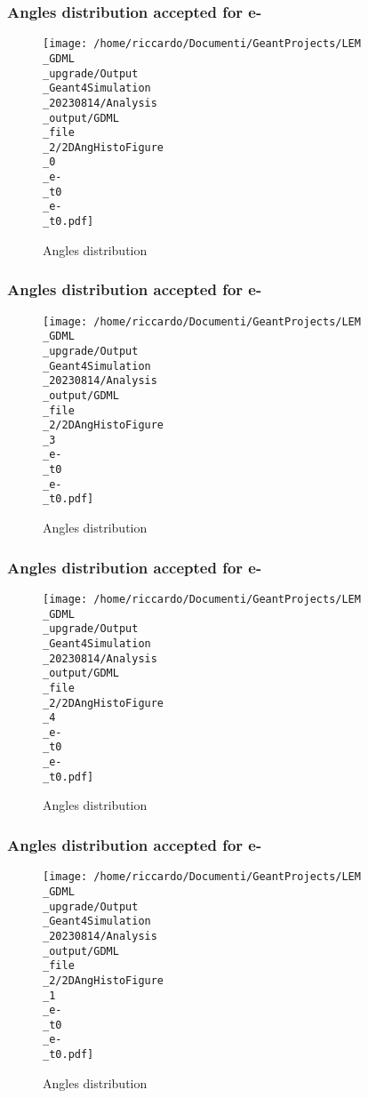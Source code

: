 \documentclass[8pt]{beamer}
\begin{document}
            \begin{frame}
                \frametitle{Angles distribution accepted for e-}
            
        \begin{figure}[h]
            \centering
            \texttt{[image: /home/riccardo/Documenti/GeantProjects/LEM\\\_GDML\\\_upgrade/Output\\\_Geant4Simulation\\\_20230814/Analysis\\\_output/GDML\\\_file\\\_2/2DAngHistoFigure\\\_0\\\_e-\\\_t0\\\_e-\\\_t0.pdf]}
            \caption{Angles distribution}
        \end{figure}
        
            \end{frame}
            
            \begin{frame}
                \frametitle{Angles distribution accepted for e-}
            
        \begin{figure}[h]
            \centering
            \texttt{[image: /home/riccardo/Documenti/GeantProjects/LEM\\\_GDML\\\_upgrade/Output\\\_Geant4Simulation\\\_20230814/Analysis\\\_output/GDML\\\_file\\\_2/2DAngHistoFigure\\\_3\\\_e-\\\_t0\\\_e-\\\_t0.pdf]}
            \caption{Angles distribution}
        \end{figure}
        
            \end{frame}
            
            \begin{frame}
                \frametitle{Angles distribution accepted for e-}
            
        \begin{figure}[h]
            \centering
            \texttt{[image: /home/riccardo/Documenti/GeantProjects/LEM\\\_GDML\\\_upgrade/Output\\\_Geant4Simulation\\\_20230814/Analysis\\\_output/GDML\\\_file\\\_2/2DAngHistoFigure\\\_4\\\_e-\\\_t0\\\_e-\\\_t0.pdf]}
            \caption{Angles distribution}
        \end{figure}
        
            \end{frame}
            
            \begin{frame}
                \frametitle{Angles distribution accepted for e-}
            
        \begin{figure}[h]
            \centering
            \texttt{[image: /home/riccardo/Documenti/GeantProjects/LEM\\\_GDML\\\_upgrade/Output\\\_Geant4Simulation\\\_20230814/Analysis\\\_output/GDML\\\_file\\\_2/2DAngHistoFigure\\\_1\\\_e-\\\_t0\\\_e-\\\_t0.pdf]}
            \caption{Angles distribution}
        \end{figure}
        
            \end{frame}
            
\end{document}
